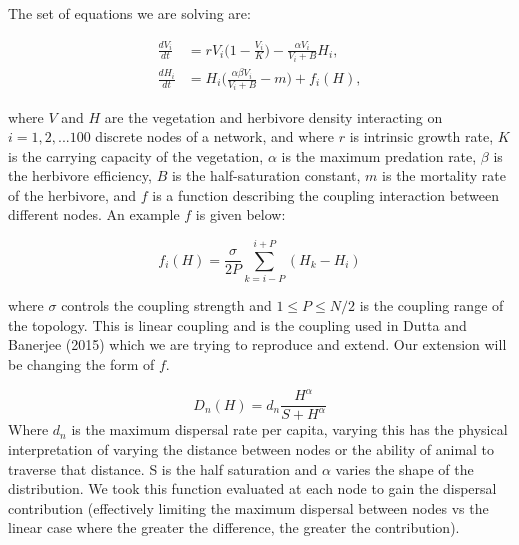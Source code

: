\documentclass[11pt]{amsart}
\title{}
\author{}
\begin{document}
\maketitle

The set of equations we are solving are:

\begin{align}
\frac{dV_i}{dt} &= rV_i\Big(1 - \frac{V_i}{K}\Big) - \frac{\alpha V_i}{V_i + B}H_i, \\
\frac{dH_i}{dt} &= H_i\Big(\frac{\alpha \beta V_i}{V_i + B} - m\Big) + f_i(H),
\end{align}

\noindent where $V$ and $H$ are the vegetation and herbivore density interacting on $i = 1, 2, ... 100$ discrete nodes of a network, and where $r$ is intrinsic growth rate, $K$ is the carrying capacity of the vegetation, $\alpha$ is the maximum predation rate, $\beta$ is the herbivore efficiency, $B$ is the half-saturation constant, $m$ is the mortality rate of the herbivore, and $f$ is a function describing the coupling interaction between different nodes. An example $f$ is given below:

\begin{equation}
f_i(H) = \frac{\sigma}{2P} \sum_{k = i - P}^{i + P} (H_k - H_i)
\end{equation}

\noindent where $\sigma$ controls the coupling strength and $1 \leq P \leq N/2$ is the coupling range of the topology. This is linear coupling and is the coupling used in Dutta and Banerjee (2015) which we are trying to reproduce and extend. Our extension will be changing the form of $f$.

\begin{equation}
D_n(H)=d_n\frac{H^\alpha}{S+H^\alpha}
\end{equation}
Where $d_n$ is the maximum dispersal rate per capita, varying this has the physical interpretation of varying the distance between nodes or the ability of animal to traverse that distance. S is the half saturation and $\alpha$ varies the shape of the distribution. We took this function evaluated at each node to gain the dispersal contribution (effectively limiting the maximum dispersal between nodes vs the linear case where the greater the difference, the greater the contribution).
\end{document}
